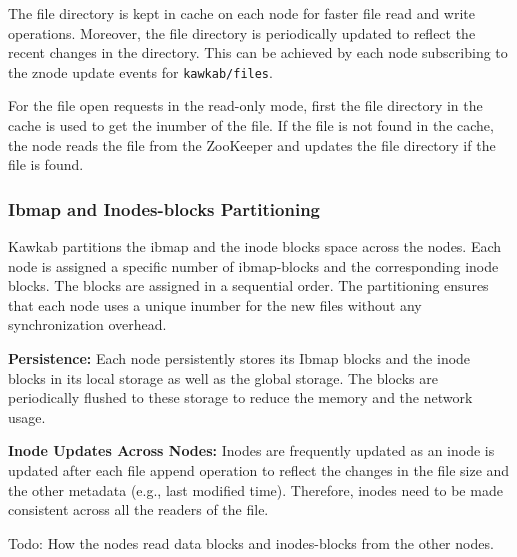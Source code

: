 \documentclass[]{article}
\newcommand{\subtopic}[1]{\vspace{1.5pt} \noindent \textbf{#1}}
\newcommand{\hl}[1]{\textcolor{hlcolor}{#1}}
\begin{document}
The file directory is kept in cache on each node for faster file read and write
operations. Moreover, the file directory is periodically updated to reflect the
recent changes in the directory. This can be achieved by each node subscribing
to the znode update events for \texttt{kawkab/files}.

For the file open requests in the read-only mode, first the file directory in
the cache is used to get the inumber of the file. If the file is not found in
the cache, the node reads the file from the ZooKeeper and updates the file
directory if the file is found.



\subsubsection{Ibmap and Inodes-blocks Partitioning} Kawkab partitions the ibmap
and the inode blocks space across the nodes. Each node is assigned a specific
number of ibmap-blocks and the corresponding inode blocks.
The blocks are assigned in a sequential order. The partitioning ensures that
each node uses a unique inumber for the new files without any synchronization
overhead.

\subtopic{Persistence:} Each node persistently stores its Ibmap blocks and the
inode blocks in its local storage as well as the global storage. The blocks are
periodically flushed to these storage to reduce the memory and the network usage.

\subtopic{Inode Updates Across Nodes:} Inodes are frequently updated as an inode is
updated after each file append operation to reflect the changes in the file
size and the other metadata (e.g., last modified time).  Therefore, inodes need
to be made consistent across all the readers of the file.

\hl{Todo: How the nodes read data blocks and inodes-blocks from the other nodes.}

\end{document}
